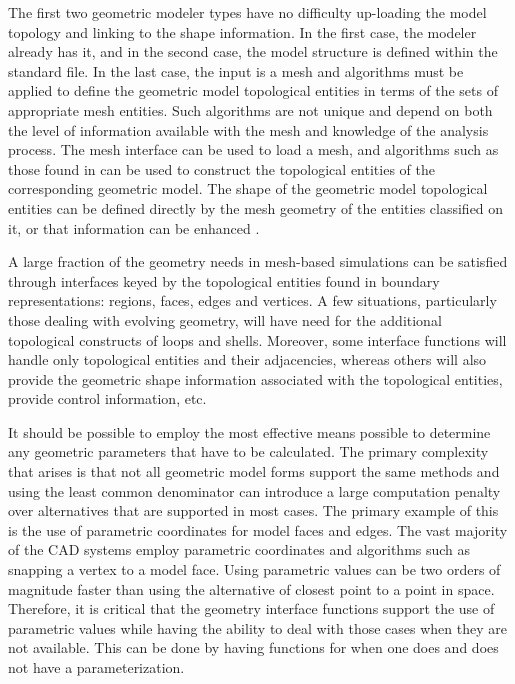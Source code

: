 The first two geometric modeler types have no difficulty up-loading the model
topology and linking to the shape information.  In the first case,
the modeler already has it, and in the second case, the model structure
is defined within the standard file. In the last case, the input is a
mesh and algorithms must be applied to define the geometric model
topological entities in terms of the sets of appropriate mesh
entities. Such algorithms are not unique and depend on both the level
of information available with the mesh and knowledge of the analysis
process. 
The mesh interface can be used to load a mesh, and algorithms such as
those found in \cite{KrOr01,PaOr02,WaKo04} can be used to construct the
topological entities of the corresponding geometric model. The shape
of the geometric model topological entities can be defined
directly by the mesh geometry of the entities classified on it, or
that information can be enhanced \cite{CiOr00,WaKo04}.

A large fraction of the geometry needs in mesh-based simulations can
be satisfied through interfaces keyed by the topological entities
found in boundary representations: regions, faces, edges and vertices.
A few situations, particularly those dealing with evolving geometry,
will have need for the additional topological constructs of loops and
shells.  Moreover, some interface functions will handle only
topological entities and their adjacencies, whereas others will also
provide the geometric shape information associated with the
topological entities, provide control information, etc.  

It should be possible to employ the most effective means possible to
determine any geometric parameters that have to be calculated. The
primary complexity that arises is that not all
geometric model forms support the same methods and using the least
common denominator can introduce a large computation penalty over
alternatives that are supported in most cases. The primary example of
this is the use of parametric coordinates for model faces and
edges. The vast majority of the CAD systems employ parametric
coordinates and algorithms such as snapping a vertex to a model face.
Using parametric values can be two orders of magnitude faster
than using the alternative of closest point to a point in
space. Therefore, it is critical that the geometry interface functions
support the use of parametric values while having the ability to deal
with those cases when they are not available. This can be done by
having functions for when one does and does not have a parameterization.
 
